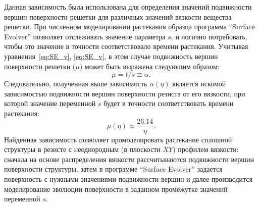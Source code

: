 Данная зависимость была использована для определения значений подвижности вершин поверхности решетки для различных значений вязкости вещества решетки. При численном моделировании растекания образца программа ``Surface Evolver'' позволяет отслеживать значение параметра $s$, и логично потребовать, чтобы это значение в точности соответствовало времени растекания. Учитывая уравнения~\ref{eq:SE_v}, \ref{eq:SE_v}, в этом случае подвижность вершин поверхности решетки ($\mu$) может быть выражена следующим образом:
\begin{equation}
	\mu = t / s \equiv \alpha.
\end{equation}
Следовательно, полученная выше зависимость $\alpha(\eta)$ является искомой зависимостью подвижности вершин поверхности резиста от его вязкости, при которой значение переменной $s$ будет в точности соответствовать времени растекания:
\begin{equation}
	\mu(\eta) \approx \frac{26.14}{\eta}.
\end{equation}
Найденная зависимость позволяет промоделировать растекание сплошной структуры в резисте с неоднородным (в плоскости $XY$) профилем вязкости: сначала на основе распределения вязкости рассчитываются подвижности вершин поверхности структуры, затем в программе ``Surface Evolver'' задается поверхность с нужными значениями подвижности вершин и далее производится моделирование эволюции поверхности в заданном промежутке значений переменной $s$.

